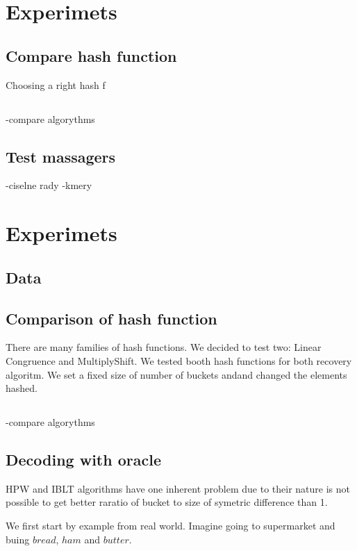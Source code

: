 \chapter{Experimets}

\section{Compare hash function}
Choosing a right hash f

\section{}
-compare algorythms

\section{Test massagers}
-ciselne rady
-kmery

\chapter{Experimets}

\section{Data}


\section{Comparison of hash function}
There are many families of hash functions. We decided to test two: Linear Congruence and MultiplyShift.
We tested booth hash functions for both recovery algoritm. We set a fixed size of number of buckets andand changed the elements hashed.

\section{}
-compare algorythms

\section{Decoding with oracle}
HPW and IBLT algorithms have one inherent problem due to their nature is not possible to get better raratio of bucket to size of symetric difference than 1. 

We first start by example from real world. Imagine going to supermarket and buing $bread$, $ham$ and $butter$.

